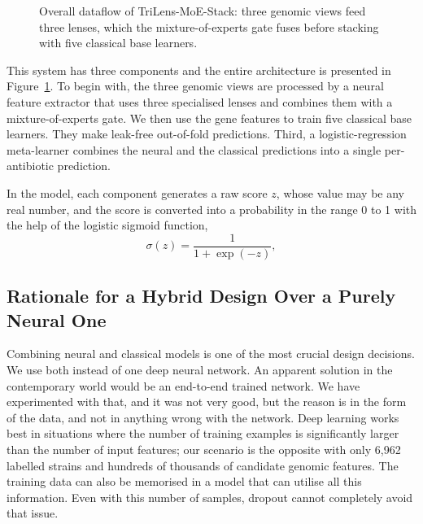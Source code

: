 \begin{figure}[H]
  \centering
  \resizebox{0.86\textwidth}{!}{}
  \caption{Overall dataflow of TriLens-MoE-Stack: three genomic views feed three lenses, which the mixture-of-experts gate fuses before stacking with five classical base learners.}
  \label{fig:trilens-overall}
\end{figure}


This system has three components and the entire architecture is presented in
Figure~\ref{fig:trilens-overall}. To begin with, the three genomic views are processed by a
neural feature extractor that uses three specialised lenses and combines them with a
mixture-of-experts gate. We then use the gene features to train five classical base learners. They make leak-free
out-of-fold predictions. Third, a logistic-regression meta-learner
combines the neural and the classical predictions into a single per-antibiotic prediction.

In the model, each component generates a raw score $z$, whose value may be any real
number, and the score is converted into a probability in the range 0 to 1 with the help of the
logistic sigmoid function,
\begin{equation}
\sigma(z) = \frac{1}{1 + \exp(-z)},
\label{eq:sigmoid}
\end{equation}

\FloatBarrier
\subsection{Rationale for a Hybrid Design Over a Purely Neural One}
\label{subsec:hybrid}

Combining neural and classical models is one of the most crucial design decisions. We use both
instead of one deep neural network. An apparent solution in the contemporary world would be an end-to-end
trained network. We have experimented with that, and it was not very good, but the reason is
in the form of the data, and not in anything wrong with the network. Deep learning works best
in situations where the number of training examples is significantly larger than the number of
input features; our scenario is the opposite with only 6{,}962 labelled strains and hundreds of
thousands of candidate genomic features. The training data can also be memorised in a model that can utilise all this information. Even
with this number of samples, dropout cannot completely avoid that issue.

